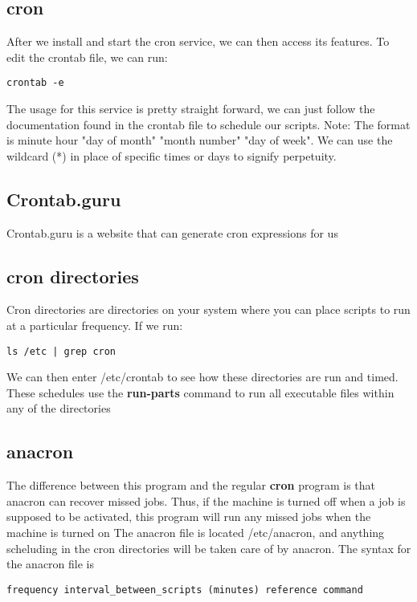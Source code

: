\documentclass{report}
\begin{document}
    \subsection{cron}
    \bigbreak \noindent 
    After we install and start the cron service, we can then access its features. To edit the crontab file, we can run:
    \begin{verbatim}
crontab -e
    \end{verbatim}
    \bigbreak \noindent 
    The usage for this service is pretty straight forward, we can just follow the documentation found in the crontab file to schedule our scripts.
    \bigbreak \noindent 
    Note: The format is minute hour "day of month" "month number" "day of week". We can use the wildcard (*) in place of specific times or days to signify perpetuity.

    \bigbreak \noindent 
    \subsection{Crontab.guru}
    \bigbreak \noindent 
    Crontab.guru is a website that can generate cron expressions for us

    \bigbreak \noindent 
    \subsection{cron directories}
    \bigbreak \noindent 
    \begin{concept}
        Cron directories are directories on your system where you can place scripts to run at a particular frequency. If we run:
    \end{concept}
    \bigbreak \noindent 
    \begin{verbatim}
ls /etc | grep cron
    \end{verbatim}
    \bigbreak \noindent
    We can then enter /etc/crontab to see how these directories are run and timed. These schedules use the \textbf{run-parts} command to run all executable files within any of the directories 

    \bigbreak \noindent 
    \subsection{anacron}
    \bigbreak \noindent 
    The difference between this program and the regular \textbf{cron} program is that anacron can recover missed jobs. Thus, if the machine is turned off when a job is supposed to be activated, this program will run any missed jobs when the machine is turned on 
    \bigbreak \noindent 
    The anacron file is located /etc/anacron, and anything scheluding in the cron directories will be taken care of by anacron. The syntax for the anacron file is 
    \bigbreak \noindent
\begin{verbatim}
frequency interval_between_scripts (minutes) reference command
\end{verbatim}
\bigbreak \noindent
    
\end{document}
